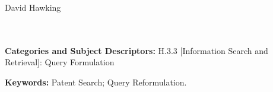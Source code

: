 \documentclass{sig-alternate-2013}
\begin{document}
{       %
\alignauthor 
      David Hawking\\%
       \\
       \\
}

\date{16 February 2015}

\maketitle
\begin{abstract}


\end{abstract}



\vspace{1mm}
\noindent
{\bf Categories and Subject Descriptors:} H.3.3 {[Information Search and Retrieval}]: {Query Formulation}

\vspace{1mm}
\noindent
{\bf Keywords:} Patent Search; Query Reformulation.%
\end{document}
